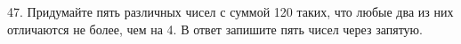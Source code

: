 47. Придумайте пять различных чисел с суммой 120 таких, что любые два из них отличаются не более, чем на 4. В ответ запишите пять чисел через запятую.\\
